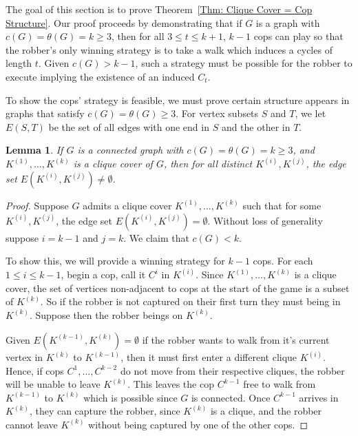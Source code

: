 \documentclass[12pt]{amsart}
\newtheorem{lemma}[theorem]{Lemma}
\theoremstyle{definition}
\begin{document}
The goal of this section is to prove Theorem~\ref{Thm: Clique Cover = Cop Structure}.
Our proof proceeds by demonstrating that if $G$ is a graph with $c(G) = \theta(G) = k\geq 3$, 
then for all $3 \leq t \leq k+1$, $k-1$ cops can play so that the 
robber's only winning strategy is to take a walk which induces a cycles of length $t$.
Given  $c(G) > k - 1$, such a strategy must be possible for the robber to execute implying the existence of an induced $C_t$. 

To show the cops' strategy is feasible,
we must prove certain structure appears in graphs that satisfy $c(G) = \theta(G)\geq 3$.
For vertex subsets $S$ and $T$, we let $E(S,T)$ be the set of all edges with one end in $S$ and the other in $T$.

\begin{lemma}\label{Lemma: Complete-Clique-Decomposition}
    If $G$ is a connected graph with $c(G) = \theta(G) = k\geq 3$, and $K^{(1)}, \dots, K^{(k)}$ is a clique cover of $G$,
    then for all distinct $K^{(i)}, K^{(j)}$, the edge set $E(K^{(i)},K^{(j)})\neq \emptyset$.
\end{lemma}

\begin{proof}
    Suppose $G$ admits a clique cover $K^{(1)}, \dots, K^{(k)}$ such that for some $K^{(i)}, K^{(j)}$, the edge set $E(K^{(i)},K^{(j)})= \emptyset$.
    Without loss of generality suppose $i=k-1$ and $j = k$.
    We claim that $c(G) < k$.

    To show this, we will provide a winning strategy for $k-1$ cops.
    For each $1\leq i \leq k-1$, begin a cop, call it $C^i$ in $K^{(i)}$.
    Since $K^{(1)}, \dots, K^{(k)}$ is a clique cover, the set of vertices non-adjacent to cops at the start of the game is a subset of $K^{(k)}$.
    So if the robber is not captured on their first turn they must being in $K^{(k)}$.
    Suppose then the robber beings on $K^{(k)}$.

    Given $E(K^{(k-1)},K^{(k)})= \emptyset$ if the robber wants to walk from it's current vertex in $K^{(k)}$ to $K^{(k-1)}$, then it must first enter a different clique $K^{(i)}$.
    Hence, if cops $C^1,\dots, C^{k-2}$ do not move from their respective cliques, the robber will be unable to leave $K^{(k)}$.
    This leaves the cop $C^{k-1}$ free to walk from $K^{(k-1)}$ to $K^{(k)}$ which is possible since $G$ is connected.
    Once $C^{k-1}$ arrives in $K^{(k)}$, they can capture the robber, since $K^{(k)}$ is a clique, and the robber cannot leave $K^{(k)}$ without being captured by one of the other cops.
\end{proof}
\end{document}
